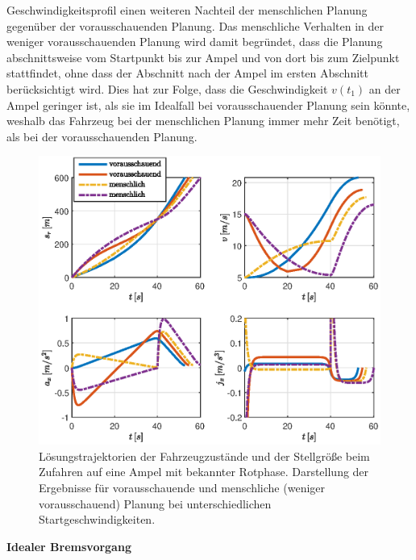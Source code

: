 Geschwindigkeitsprofil einen weiteren Nachteil der menschlichen Planung gegenüber der vorausschauenden Planung. Das menschliche Verhalten in der weniger vorausschauenden Planung wird damit begründet, dass die Planung abschnittsweise vom Startpunkt bis zur Ampel und von dort bis zum Zielpunkt stattfindet, ohne dass der Abschnitt nach der Ampel im ersten Abschnitt berücksichtigt wird. Dies hat zur Folge, dass die Geschwindigkeit $v(t_1)$ an der Ampel geringer ist, als sie im Idealfall bei vorausschauender Planung sein könnte, weshalb das Fahrzeug bei der menschlichen Planung immer mehr Zeit benötigt, als bei der vorausschauenden Planung.
\begin{figure}[h] 
	\centering
	\includegraphics[width=\linewidth]{./Bilder/Ergebnisse/Geradeausfahrt/Ampel/v_5_v_15/svaj_zoomj.eps}
	\caption{Lösungstrajektorien der Fahrzeugzustände und der Stellgröße beim Zufahren auf eine Ampel mit bekannter Rotphase. Darstellung der Ergebnisse für vorausschauende und menschliche (weniger vorausschauend) Planung bei unterschiedlichen Startgeschwindigkeiten.}
	\label{fig:svaj_zoomj}
\end{figure} 

\textbf{Idealer Bremsvorgang}

